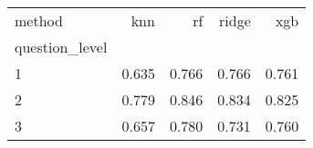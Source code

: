 \begin{tabular}{lrrrr}
\toprule
method & knn & rf & ridge & xgb \\
question_level &  &  &  &  \\
\midrule
1 & 0.635 & 0.766 & 0.766 & 0.761 \\
2 & 0.779 & 0.846 & 0.834 & 0.825 \\
3 & 0.657 & 0.780 & 0.731 & 0.760 \\
\bottomrule
\end{tabular}
